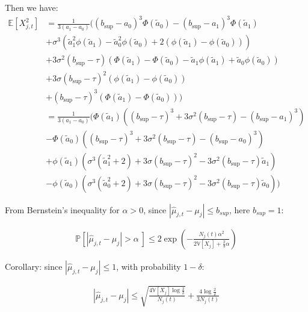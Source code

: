 \documentclass[11pt]{article}
\begin{document}
Then we have:
\begin{align*}
  \mathbb{E}[X_{j,t}^2] &= \frac{1}{3(a_1 - a_0)}\biggl( (b_{\sup}-a_0)^3 \Phi\left(\tilde{a}_0\right) - (b_{\sup}-a_1)^3 \Phi\left(\tilde{a}_1\right)\\
 & + \sigma^3 \left( \tilde{a}_1^2 \phi(\tilde{a}_1) -\tilde{a}_0^2 \phi(\tilde{a}_0) + 2 \left( \phi\left(\tilde{a}_1\right) - \phi\left(\tilde{a}_0\right)\right) \right)\\
 & + 3 \sigma^2 (b_{\sup}- \tau) \left( \Phi\left(\tilde{a}_1\right) -  \Phi\left(\tilde{a}_0\right) - \tilde{a}_1 \phi\left(\tilde{a}_1\right) + \tilde{a}_0 \phi\left(\tilde{a}_0\right)\right)\\
 & + 3 \sigma (b_{\sup}- \tau)^2 \left( \phi\left(\tilde{a}_1\right) - \phi\left(\tilde{a}_0\right)\right)\\
 & +  (b_{\sup}- \tau)^3 \left(\Phi\left(\tilde{a}_1\right) - \Phi\left(\tilde{a}_0\right) \right)\biggr)\\
 & = \frac{1}{3(a_1 - a_0)}\biggl(\Phi\left(\tilde{a}_1\right) \left( (b_{\sup}- \tau)^3 +3 \sigma^2 (b_{\sup}- \tau) - (b_{\sup}-a_1)^3\right)\\
 & - \Phi\left(\tilde{a}_0\right) \left( (b_{\sup}- \tau)^3 +3 \sigma^2 (b_{\sup}- \tau) - (b_{\sup}-a_0)^3\right) \\
 & + \phi\left(\tilde{a}_1\right)\left( \sigma^3 \left(\tilde{a}_1^2 + 2 \right) + 3 \sigma (b_{\sup}- \tau)^2 - 3 \sigma^2 (b_{\sup}- \tau)\tilde{a}_1  \right) \\
 & - \phi\left(\tilde{a}_0\right)\left( \sigma^3 \left(\tilde{a}_0^2 + 2 \right) + 3 \sigma (b_{\sup}- \tau)^2 - 3 \sigma^2 (b_{\sup}- \tau)\tilde{a}_0  \right) \biggr)
\end{align*}

From Bernstein's inequality for $\alpha > 0$, since $\left|\hat{\mu}_{j,t} -\mu_j\right|\leq b_{sup}$, here $b_{sup} = 1$:

\begin{align*}
  \mathbb{P}\left[\left|\hat{\mu}_{j,t} -\mu_j\right| > \alpha \ \right] \leq 2 \exp\left(- \frac{N_j(t)\alpha^2}{2 \mathbb{V}[X_j] + \frac{2}{3} \alpha}\right)
\end{align*}

Corollary: since $\left|\hat{\mu}_{j,t} -\mu_j\right|\leq 1$, with probability $1 - \delta$:

\begin{align*}
  \left|\hat{\mu}_{j,t} -\mu_j\right|  \leq \sqrt{\frac{4 \mathbb{V}[X_j] \log \frac{2}{\delta}}{N_j(t)}} + \frac{4 \log\frac{2}{\delta}}{3N_j(t)}
\end{align*}
\end{document}
